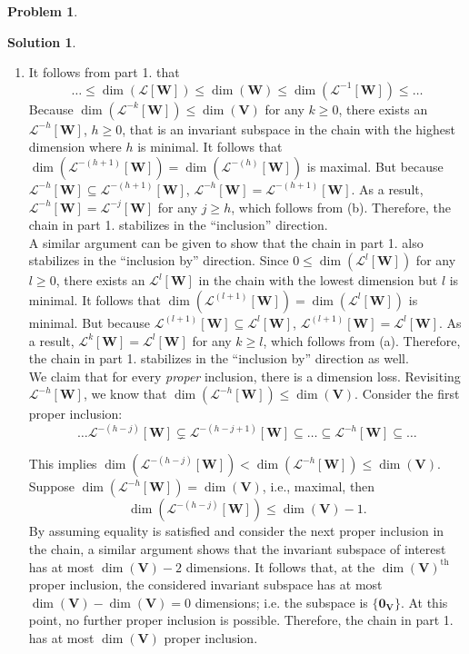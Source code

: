 \documentclass{book}
\theoremstyle{definition}
\newtheorem*{prob*}{Problem}
\newtheorem*{sln*}{Solution}
\newcommand{\V}{\mathbf{V}}
\newcommand{\W}{\mathbf{W}}
\newcommand{\lag}{\mathcal{L}}
\begin{document}
\begin{prob*}
\begin{sln*}
\begin{enumerate}
\begin{enumerate}
				

				\item It follows from part 1. that $$ \dots \leq \dim(\lag[\W]) \leq \dim(\W) \leq \dim(\lag^{-1}[\W]) \leq \dots  $$
				Because $\dim(\lag^{-k}[\W]) \leq \dim(\V)$ for any $k\geq 0$, there exists an $\lag^{-h}[\W]$, $h\geq 0$, that is an invariant subspace in the chain with the highest dimension where $h$ is minimal. It follows that $\dim(\lag^{-(h+1)}[\W]) = \dim(\lag^{-(h)}[\W])$ is maximal. But because $\lag^{-h}[\W] \subseteq \lag^{-(h+1)}[\W]$, $\lag^{-h}[\W] = \lag^{-(h+1)}[\W]$. As a result, $\lag^{-h}[\W] = \lag^{-j}[\W]$ for any $j\geq h$, which follows from (b). Therefore, the chain in part 1. stabilizes in the ``inclusion'' direction.  \\
				
				A similar argument can be given to show that the chain in part 1. also stabilizes in the ``inclusion by'' direction. Since $0 \leq \dim(\lag^{l}[\W])$ for any $l\geq 0$, there exists an $\lag^l[\W]$ in the chain with the lowest dimension but $l$ is minimal. It follows that $\dim(\lag^{(l+1)}[\W]) = \dim(\lag^{l}[\W])$ is minimal. But because $\lag^{(l+1)}[\W] \subseteq \lag^{l}[\W]$, $\lag^{(l+1)}[\W] = \lag^{l}[\W]$. As a result, $\lag^{k}[\W] = \lag^{l}[\W]$ for any $k\geq l$, which follows from (a). Therefore, the chain in part 1. stabilizes in the ``inclusion by'' direction as well.\\
				
				We claim that for every \textit{proper} inclusion, there is a dimension loss. Revisiting $\lag^{-h}[\W]$, we know that $\dim(\lag^{-h}[\W]) \leq \dim(\V)$. Consider the first proper inclusion: $$\dots \lag^{-(h-j)}[\W] \subsetneq \lag^{-(h-j+1)}[\W] \subseteq \dots \subseteq \lag^{-h}[\W]\subseteq \dots$$ 
				
				This implies $\dim(\lag^{-(h-j)}[\W]) < \dim(\lag^{-h}[\W]) \leq \dim(\V)$. Suppose $\dim(\lag^{-h}[\W]) = \dim(\V)$, i.e., maximal, then $$\dim(\lag^{-(h-j)}[\W]) \leq \dim(\V) - 1.$$ By assuming equality is satisfied and consider the next proper inclusion in the chain, a similar argument shows that the invariant subspace of interest has at most $\dim(\V) - 2$ dimensions. It follows that, at the $\dim(\V)^{\text{th}}$ proper inclusion, the considered invariant subspace has at most $\dim(\V) - \dim(\V) = 0$ dimensions; i.e. the subspace is $\{\mathbf{0}_\V\}$. At this point, no further proper inclusion is possible. Therefore, the chain in part 1. has at most $\dim(\V)$ proper inclusion.\\
			\end{enumerate}
				

\end{enumerate}
\end{sln*}
\end{prob*}
\end{document}

